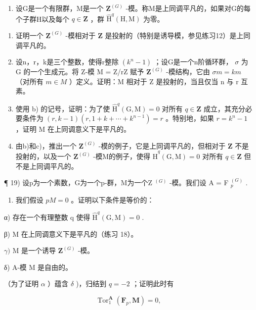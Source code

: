 \begin{enumerate}
\def\labelenumi{\arabic{enumi})}
\setcounter{enumi}{17}
\tightlist
\item
  设G是一个有限群，M是一个 \(\mathbf{Z}^{(G)}\) -模。称M是上同调平凡的，如果对G的每个子群H以及每个 \(q \in \mathbf{Z}\) ，群 \(\hat{\mathrm{H}}^q(\mathrm{H}, \mathrm{M})\) 为零。
\end{enumerate}

\begin{enumerate}
\def\labelenumi{\alph{enumi})}
\item
  证明一个 \(\mathbf{Z}^{(G)}\) -模相对于 \(\mathbf{Z}\) 是投射的（特别是诱导模，参见练习12）是上同调平凡的。
\item
  设n，r，k是三个整数，使得r整除 \((k^{n} - 1)\) ；设G是一个n阶循环群， \(\sigma\) 为 G 的一个生成元。将 Z-模 M = Z/rZ 赋予 \(\mathbf{Z}^{(G)}\) -模结构，它由 \(\sigma m = km\) （对所有 \(m \in M\) ）定义。证明：M 相对于 Z 是投射的，当且仅当 n 与 r 互素。
\item
  使用 b) 的记号，证明：为了使 \(\hat{\mathrm{H}}^{q}(\mathrm{G}, \mathrm{M}) = 0\) 对所有 \(q \in \mathbf{Z}\) 成立，其充分必要条件为 \((r, k - 1)(r, 1 + k + \cdots + k^{n-1}) = r\) 。特别地，如果 \(r = k^{n} - 1\) ，证明 M 在上同调意义下是平凡的。
\item
  由b)和c)，推出一个 \(\mathbf{Z}^{(G)}\) -模的例子，它是上同调平凡的，但相对于 \(\mathbf{Z}\) 不是投射的，以及一个 \(\mathbf{Z}^{(G)}\) -模M的例子，使得 \(\hat{\mathrm{H}}^q (\mathrm{G},\mathrm{M}) = 0\) 对所有 \(q\in \mathbf{Z}\) 但不是上同调平凡的。
\end{enumerate}

¶ 19) 设p为一个素数，G为一个p-群，M为一个Z \(^{(G)}\) -模。我们设 A = F \(_{p}^{(G)}\) .

\begin{enumerate}
\def\labelenumi{\alph{enumi})}
\tightlist
\item
  我们假设 \(pM = 0\) 。证明以下条件是等价的：
\end{enumerate}

α) 存在一个有理整数 q 使得 \(\hat{\mathrm{H}}^{q}(\mathrm{G},\mathrm{M})=0\) .

β) M 在上同调意义下是平凡的（练习 18）。

\(\gamma)\) M 是一个诱导 \(\mathbf{Z}^{(G)}\) -模。

δ) A-模 M 是自由的。

（为了证明 \(\alpha\) ）蕴含 \(\delta\) )，归结到 \(q = -2\) ；证明此时有

\[
\operatorname{Tor} _ {1} ^ {\mathbf {A}} \left(\mathbf {F} _ {p}, \mathbf {M}\right) = 0,
\]

